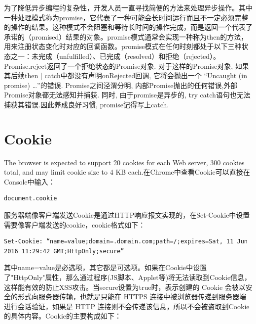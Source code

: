 \documentclass[letter]{book}
\begin{document}
为了降低异步编程的复杂性，开发人员一直寻找简便的方法来处理异步操作。其中一种处理模式称为promise，它代表了一种可能会长时间运行而且不一定必须完整的操作的结果。这种模式不会阻塞和等待长时间的操作完成，而是返回一个代表了承诺的（promised）结果的对象。promise模式通常会实现一种称为then的方法，用来注册状态变化时对应的回调函数。promise模式在任何时刻都处于以下三种状态之一：未完成（unfulfilled）、已完成（resolved）和拒绝（rejected）。Promise.reject返回了一个拒绝状态的Promise对象. 对于这样的Promise对象, 如果其后续then | catch中都没有声明onRejected回调, 它将会抛出一个 “Uncaught (in promise) …”的错误. Promise之间泾渭分明, 内部Promise抛出的任何错误,外部Promise对象都无法感知并捕获. 同时, 由于promise是异步的, try catch语句也无法捕获其错误.因此养成良好习惯, promise记得写上catch.

\section{Cookie}

The browser is expected to support 20 cookies for each Web server, 300 cookies total, and may limit cookie size to 4 KB each.在Chrome中查看Cookie可以直接在Console中输入：

\begin{lstlisting}[language=Bash]
document.cookie
\end{lstlisting}

服务器端像客户端发送Cookie是通过HTTP响应报文实现的，在Set-Cookie中设置需要像客户端发送的cookie，cookie格式如下：

\begin{lstlisting}
Set-Cookie: “name=value;domain=.domain.com;path=/;expires=Sat, 11 Jun 2016 11:29:42 GMT;HttpOnly;secure”
\end{lstlisting}

其中name=value是必选项，其它都是可选项。如果在Cookie中设置了"HttpOnly"属性，那么通过程序(JS脚本、Applet等)将无法读取到Cookie信息，这样能有效的防止XSS攻击。当secure设置为true时，表示创建的 Cookie 会被以安全的形式向服务器传输，也就是只能在 HTTPS 连接中被浏览器传递到服务器端进行会话验证，如果是 HTTP 连接则不会传递该信息，所以不会被盗取到Cookie 的具体内容。Cookie的主要构成如下：
\end{document}
